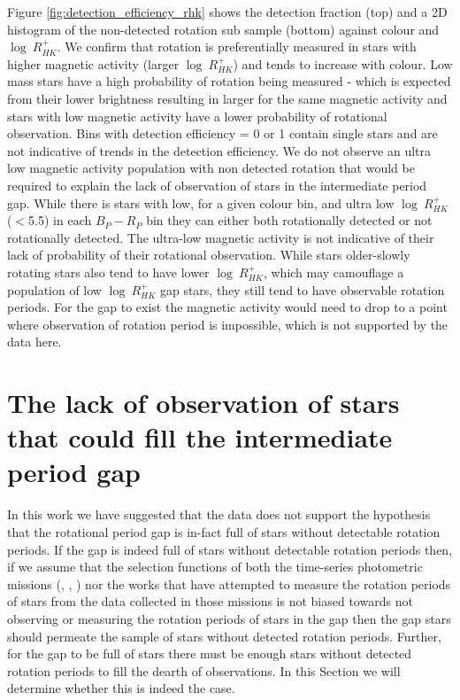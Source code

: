 Figure \ref{fig:detection_efficiency_rhk} shows the detection fraction (top) and a 2D histogram of the non-detected rotation sub sample (bottom) against colour and $\log \ R^{+}_{HK}$. 
We confirm that rotation is preferentially measured in stars with higher magnetic activity (larger $\log \ R^{+}_{HK}$) and tends to increase with colour. 
Low mass stars have a high probability of rotation being measured - which is expected from their lower brightness resulting in larger \rper{} for the same magnetic activity and stars with low magnetic activity have a lower probability of rotational observation. 
Bins with detection efficiency = 0 or 1 contain single stars and are not indicative of trends in the detection efficiency.
We do not observe an ultra low magnetic activity population with non detected rotation that would be required to explain the lack of observation of stars in the intermediate period gap.
While there is stars with low, for a given colour bin, and ultra low $\log \ R^{+}_{HK}$  ($<$5.5) in each $B_P-R_P$ bin they can either both rotationally detected or not rotationally detected. 
The ultra-low magnetic activity is not indicative of their lack of probability of their rotational observation.
While stars older-slowly rotating stars also tend to have lower $\log \ R^{+}_{HK}$, which may camouflage a population of low $\log \ R^{+}_{HK}$ gap stars, they still tend to have observable rotation periods.
For the gap to exist the magnetic activity would need to drop to a point where observation of rotation period is impossible, which is not supported by the data here.


\section{The lack of observation of stars that could fill the intermediate period gap}
\label{sec:no_gap_stars}


In this work we have suggested that the data does not support the hypothesis that the rotational period gap is in-fact full of stars without detectable rotation periods.
If the gap is indeed full of stars without detectable rotation periods then, if we assume that the selection functions of both the time-series photometric missions (\kepler{}, \ktoo{}, \tess) nor the works that have attempted to measure the rotation periods of stars from the data collected in those missions is not biased towards not observing or measuring the rotation periods of stars in the gap then the gap stars should permeate the sample of stars without detected rotation periods.
Further, for the gap to be full of stars there must be enough stars without detected rotation periods to fill the dearth of observations.
In this Section we will determine whether this is indeed the case.

